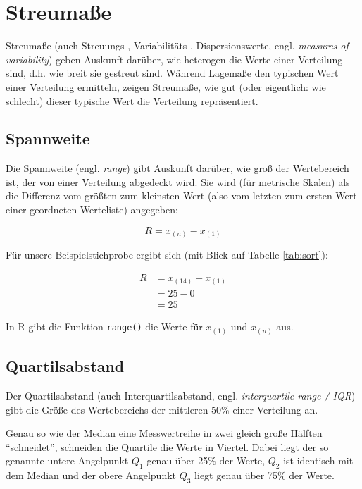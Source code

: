 \documentclass[
  11pt,
  ngerman,
  a4paper,
]{report}
\newenvironment{rtip}{
  \medskip
  \begin{tcolorbox}[colframe=purple,colback=light_gray,title=Softwarehinweis]
}{
  \end{tcolorbox}
  \medskip
}
\begin{document}
\hypertarget{streumauxdfe}{%
\section{Streumaße}\label{streumauxdfe}}

Streumaße (auch Streuungs-, Variabilitäts-, Dispersionswerte, engl. \emph{measures of variability}) geben Auskunft darüber, wie heterogen die Werte einer Verteilung sind, d.h. wie breit sie gestreut sind. Während Lagemaße den typischen Wert einer Verteilung ermitteln, zeigen Streumaße, wie gut (oder eigentlich: wie schlecht) dieser typische Wert die Verteilung repräsentiert.

\hypertarget{spannweite}{%
\subsection{Spannweite}\label{spannweite}}

Die Spannweite (engl. \emph{range}) gibt Auskunft darüber, wie groß der Wertebereich ist, der von einer Verteilung abgedeckt wird. Sie wird (für metrische Skalen) als die Differenz vom größten zum kleinsten Wert (also vom letzten zum ersten Wert einer geordneten Werteliste) angegeben:

\[
 R=x_{(n)} - x_{(1)}
 \label{eq:range}
\]

Für unsere Beispielstichprobe ergibt sich (mit Blick auf Tabelle \ref{tab:sort}):

\nopagebreak

\[
  \begin{aligned}
     R&=x_{(14)} - x_{(1)} \\[4pt]
     &=25-0 \\[4pt]
     &=25
  \end{aligned}
\]

\begin{rtip}
In R gibt die Funktion \verb|range()| die Werte für $x_{(1)}$ und $x_{(n)}$ aus.
\end{rtip}

\hypertarget{quartilsabstand}{%
\subsection{Quartilsabstand}\label{quartilsabstand}}

Der Quartilsabstand (auch Interquartilsabstand, engl. \emph{interquartile range / IQR}) gibt die Größe des Wertebereichs der mittleren 50\% einer Verteilung an.

Genau so wie der Median eine Messwertreihe in zwei gleich große Hälften \enquote{schneidet}, schneiden die Quartile die Werte in Viertel. Dabei liegt der so genannte untere Angelpunkt \(Q_1\) genau über 25\% der Werte, \(Q_2\) ist identisch mit dem Median und der obere Angelpunkt \(Q_3\) liegt genau über 75\% der Werte.
\end{document}
